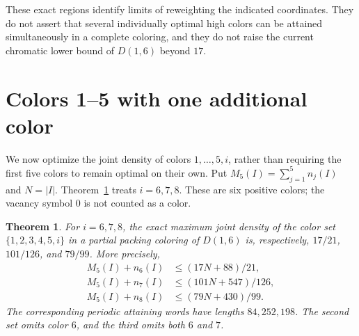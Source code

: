 \documentclass[11pt,reqno]{amsart}
\theoremstyle{plain}
\newtheorem{theorem}{Theorem}
\newcommand{\D}[1]{D(1,#1)}
\theoremstyle{plain}
\theoremstyle{plain}
\begin{document}
These exact regions identify limits of reweighting the indicated
coordinates. They do not assert that several individually optimal high
colors can be attained simultaneously in a complete coloring, and they
do not raise the current chromatic lower bound of $\D{6}$ beyond $17$.



\section{Colors 1--5 with one additional color}
\label{M-sec:six-labels}

We now optimize the joint density of colors $1,\ldots,5,i$, rather than
requiring the first five colors to remain optimal on their own. Put
$M_5(I)=\sum_{j=1}^5 n_j(I)$ and $N=|I|$. Theorem~\ref{M-thm:six-label-optima} treats $i=6,7,8$.
These are six positive colors; the vacancy symbol $0$ is not counted as a color.

\begin{theorem}\label{M-thm:six-label-optima}
For $i=6,7,8$, the exact maximum joint density of the color set
$\{1,2,3,4,5,i\}$ in a partial packing coloring of $\D{6}$ is,
respectively, $17/21$, $101/126$, and $79/99$. More precisely,
\begin{align}
 M_5(I)+n_6(I)&\le(17N+88)/21,\label{M-eq:six-total}\\
 M_5(I)+n_7(I)&\le(101N+547)/126,\label{M-eq:seven-total}\\
 M_5(I)+n_8(I)&\le(79N+430)/99.\label{M-eq:eight-total}
\end{align}
The corresponding periodic attaining words have lengths $84,252,198$.
The second set omits color $6$, and the third omits both $6$ and $7$.
\end{theorem}
\end{document}
